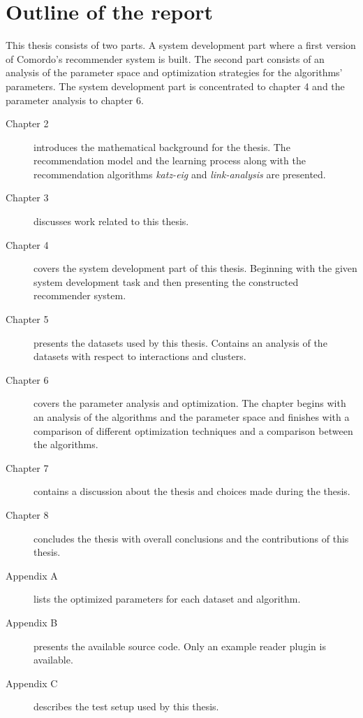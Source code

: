 
\section{Outline of the report}\label{sec:intro:outline}

This thesis consists of two parts. A system development part where a first version of Comordo's recommender system is built. The second part consists of an analysis of the parameter space and optimization strategies for the algorithms' parameters. The system development part is concentrated to chapter 4 and the parameter analysis to chapter 6.

\begin{description}
    \item[Chapter 2] introduces the mathematical background for the thesis. The recommendation model and the learning process along with the recommendation algorithms \textit{katz-eig} and \textit{link-analysis} are presented.
    \item[Chapter 3] discusses work related to this thesis.
    \item[Chapter 4] covers the system development part of this thesis. Beginning with the given system development task and then presenting the constructed recommender system.
    \item[Chapter 5] presents the datasets used by this thesis. Contains an analysis of the datasets with respect to interactions and clusters.
    \item[Chapter 6] covers the parameter analysis and optimization. The chapter begins with an analysis of the algorithms and the parameter space and finishes with a comparison of different optimization techniques and a comparison between the algorithms.
    \item[Chapter 7] contains a discussion about the thesis and choices made during the thesis.
    \item[Chapter 8] concludes the thesis with overall conclusions and the contributions of this thesis.
    \item[Appendix A] lists the optimized parameters for each dataset and algorithm.
    \item[Appendix B] presents the available source code. Only an example reader plugin is available.
    \item[Appendix C] describes the test setup used by this thesis.
\end{description}

